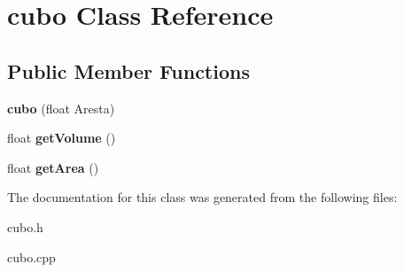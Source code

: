 \hypertarget{classcubo}{}\section{cubo Class Reference}
\label{classcubo}
\subsection*{Public Member Functions}
\begin{DoxyCompactItemize}
\item 
\mbox{\label{classcubo_a4dd22a35efe95be848258e049c93585d}} 
{\bfseries cubo} (float Aresta)
\item 
\mbox{\label{classcubo_a593b69876efbbf1e2f9ca70e927913de}} 
float {\bfseries get\+Volume} ()
\item 
\mbox{\label{classcubo_ac00b5f188051f12f591b68c923f03c6a}} 
float {\bfseries get\+Area} ()
\end{DoxyCompactItemize}


The documentation for this class was generated from the following files\+:\begin{DoxyCompactItemize}
\item 
cubo.\+h\item 
cubo.\+cpp\end{DoxyCompactItemize}
